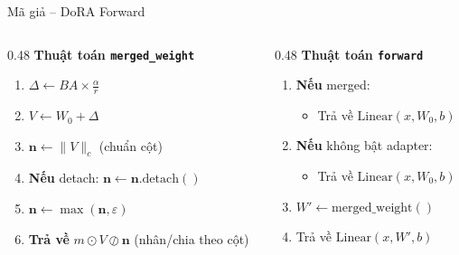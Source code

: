 \documentclass[11pt,aspectratio=169]{beamer}
\begin{document}
\begin{frame}[fragile]{Mã giả – DoRA Forward}
\footnotesize
\begin{columns}[T]

\begin{column}{0.48\textwidth}
\textbf{Thuật toán \texttt{merged\_weight}}
\begin{enumerate}
\item $\Delta \gets BA \times \frac{\alpha}{r}$
\item $V \gets W_0 + \Delta$
\item $\mathbf{n} \gets \|V\|_c$ \hfill (chuẩn cột)
\item \textbf{Nếu} detach: $\mathbf{n} \gets \mathbf{n}.\text{detach}()$
\item $\mathbf{n} \gets \max(\mathbf{n}, \varepsilon)$
\item \textbf{Trả về} $m \odot V \oslash \mathbf{n}$ \hfill (nhân/chia theo cột)
\end{enumerate}
\end{column}

\begin{column}{0.48\textwidth}
\textbf{Thuật toán \texttt{forward}}
\begin{enumerate}
\item \textbf{Nếu} merged:
   \begin{itemize}
   \item Trả về $\text{Linear}(x, W_0, b)$
   \end{itemize}
\item \textbf{Nếu} không bật adapter:
   \begin{itemize}
   \item Trả về $\text{Linear}(x, W_0, b)$
   \end{itemize}
\item $W' \gets \text{merged\_weight}()$
\item Trả về $\text{Linear}(x, W', b)$
\end{enumerate}
\end{column}

\end{columns}
\end{frame}
\end{document}
